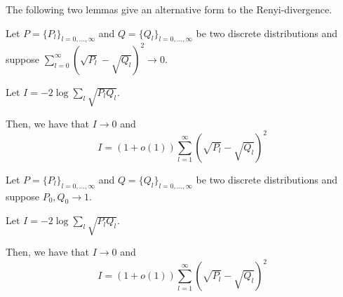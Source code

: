 \documentclass{article}
\begin{document}
The following two lemmas give an alternative form to the Renyi-divergence. 

\begin{lemma}
\label{lem:simplify_renyi2}
Let $P = \{ P_l \}_{l = 0,..., \infty}$ and $Q = \{ Q_l \}_{l=0,...,\infty}$ be two discrete distributions and suppose $\sum_{l=0}^\infty (\sqrt{P_l} - \sqrt{Q_l} )^2 \rightarrow 0$. 

Let $I = - 2 \log \sum_l \sqrt{ P_l Q_l}$.

Then, we have that $I \rightarrow 0$ and 
\[
I = (1 + o(1)) \sum_{l = 1}^\infty (\sqrt{P_l} - \sqrt{Q_l})^2 
\]
\end{lemma}



\begin{lemma}
\label{lem:simplify_renyi}
Let $P = \{ P_l \}_{l = 0,..., \infty}$ and $Q = \{ Q_l \}_{l=0,...,\infty}$ be two discrete distributions and suppose $P_0, Q_0 \rightarrow 1$. 

Let $I = - 2 \log \sum_l \sqrt{ P_l Q_l}$.

Then, we have that $I \rightarrow 0$ and 
\[
I = (1 + o(1)) \sum_{l = 1}^\infty (\sqrt{P_l} - \sqrt{Q_l})^2 
\]

\end{lemma}
\end{document}
